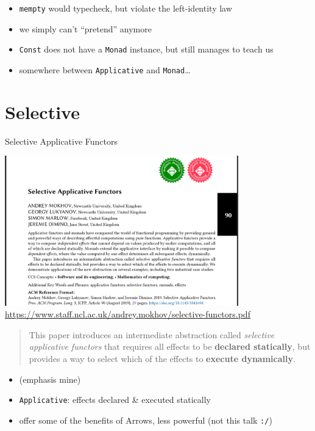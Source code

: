 \documentclass[aspectratio=169]{beamer}
\begin{document}
\begin{frame}[fragile]
  \begin{itemize}
  \item \texttt{mempty} would typecheck, but violate the left-identity law
  \item we simply can't ``pretend'' anymore
  \item \texttt{Const} does not have a \texttt{Monad} instance, but
    still manages to teach us
  \item somewhere between \texttt{Applicative} and
    \texttt{Monad}\ldots
  \end{itemize}
\end{frame}

\section{Selective}
\begin{frame}
  \begin{center}
    \Huge Selective Applicative Functors
  \end{center}
\end{frame}

\begin{frame}[fragile]
  \begin{center}
    \includegraphics[width=0.76\textwidth]{static-images/selective-applicative-functors-paper.jpg}
    \vfill
    \href{https://www.staff.ncl.ac.uk/andrey.mokhov/selective-functors.pdf}{https://www.staff.ncl.ac.uk/andrey.mokhov/selective-functors.pdf}
  \end{center}
\end{frame}

\begin{frame}
    \begin{quote}
    This paper introduces an intermediate abstraction called
    \textit{selective applicative functors} that requires all effects
    to be \textbf{declared statically}, but provides a way to select which of
    the effects to \textbf{execute dynamically}.
  \end{quote}

  \begin{itemize}
  \item (emphasis mine)
  \item \texttt{Applicative}: effects declared \& executed statically
  \item offer some of the benefits of Arrows, less powerful (not this talk \texttt{:/})
  \end{itemize}
\end{frame}
\end{document}
